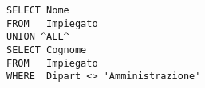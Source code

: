 \begin{lstlisting}
SELECT Nome
FROM   Impiegato
UNION ^ALL^
SELECT Cognome
FROM   Impiegato
WHERE  Dipart <> 'Amministrazione'
\end{lstlisting}

